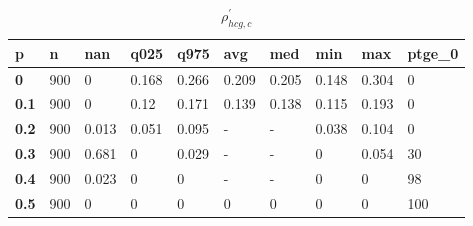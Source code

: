 \begin{table}[h]
 \centering 
\footnotesize
\caption{$\rho_{hcg,c}^\prime $}
\label{tab:alphahcgc}
\begin{tabular}[h]{|l|l|l|l|l|l|l|l|l|l|
    } \hline
\textbf{ p} & \textbf{ n} & \textbf{ nan} & \textbf{ q025} & \textbf{ q975} & \textbf{ avg} & \textbf{ med} & \textbf{ min} & \textbf{ max} & \textbf{ ptge\_0}
    \\ \hline
  \textbf{  0} & 900 &     0 & 0.168 & 0.266 & 0.209 & 0.205 & 0.148 & 0.304 &   0
    \\ \hline
  \textbf{0.1} & 900 &     0 &  0.12 & 0.171 & 0.139 & 0.138 & 0.115 & 0.193 &   0
    \\ \hline
  \textbf{0.2} & 900 & 0.013 & 0.051 & 0.095 & - & - & 0.038 & 0.104 &   0
    \\ \hline
  \textbf{0.3} & 900 & 0.681 &     0 & 0.029 & - & - &     0 & 0.054 &  30
    \\ \hline
  \textbf{0.4} & 900 & 0.023 &     0 &     0 & - & - &     0 &     0 &  98
    \\ \hline
  \textbf{0.5} & 900 &     0 &     0 &     0 &     0 &     0 &     0 &     0 & 100
    \\ \hline
 \end{tabular}
 \end{table}

